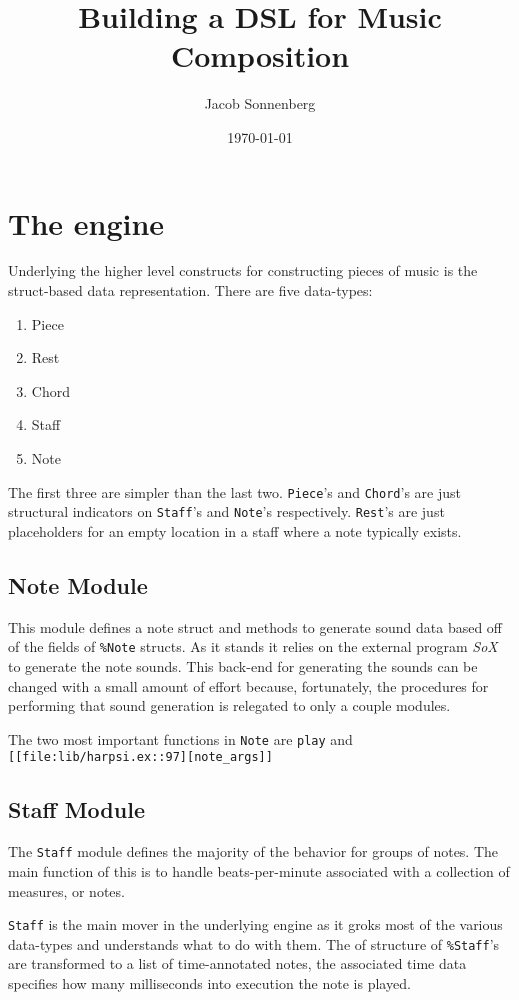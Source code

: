 \documentclass[11pt]{article}
\author{Jacob Sonnenberg}
\date{\today}
\title{Building a DSL for Music Composition}
\begin{document}
\maketitle
\tableofcontents

\section{The engine}
\label{sec-1}
Underlying the higher level constructs for constructing pieces of
music is the struct-based data representation. There are five
data-types:
\begin{enumerate}
\item Piece
\item Rest
\item Chord
\item Staff
\item Note
\end{enumerate}
The first three are simpler than the last two. \verb~Piece~'s and
\verb~Chord~'s are just structural indicators on \verb~Staff~'s and \verb~Note~'s
respectively. \verb~Rest~'s are just placeholders for an empty location
in a staff where a note typically exists.

\subsection{Note Module}
\label{sec-1-1}
This module defines a note struct and methods to generate sound
data based off of the fields of \verb~%Note~ structs. As it stands it
relies on the external program \emph{SoX} to generate the note
sounds. This back-end for generating the sounds can be changed with
a small amount of effort because, fortunately, the procedures for
performing that sound generation is relegated to only a couple
modules.

The two most important functions in \verb~Note~ are \verb~play~ and
\verb~[[file:lib/harpsi.ex::97][note_args]]~

\subsection{Staff Module}
\label{sec-1-2}
The \verb~Staff~ module defines the majority of the behavior for groups
of notes. The main function of this is to handle beats-per-minute
associated with a collection of measures, or notes.

\verb~Staff~ is the main mover in the underlying engine as it groks most
of the various data-types and understands what to do with
them. The of structure of \verb~%Staff~'s are transformed to
a list of time-annotated notes, the associated time data specifies
how many milliseconds into execution the note is played. 
\end{document}
